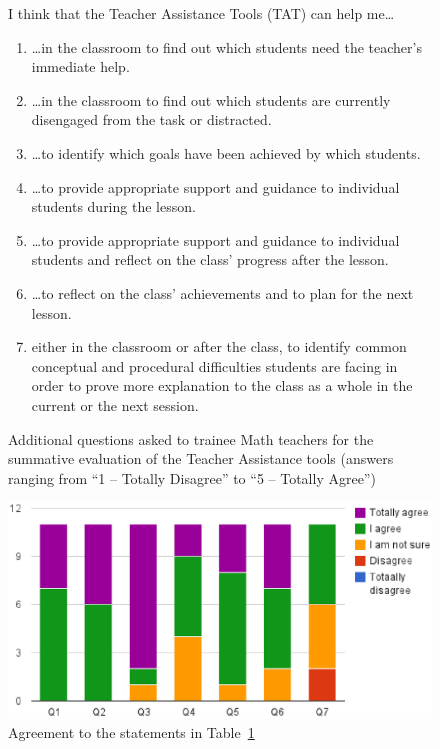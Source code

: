 \begin{figure}[htbp]
  \begin{framed}
  I think that the Teacher Assistance Tools (TAT) can help me\ldots
  \begin{enumerate}
  \item \ldots in the
    classroom to find out which students need the teacher's immediate
    help.
  \item \ldots in the classroom to find out which students are
    currently disengaged from the task or distracted.
  \item \ldots to identify which goals have been achieved by which
    students.
  \item \ldots to provide appropriate support and guidance to individual
    students during the lesson.
  \item \ldots to provide appropriate support and guidance to individual
    students and reflect on the class' progress after the lesson.
  \item \ldots to reflect on the class' achievements and to plan for
    the next lesson.
  \item either in the classroom or after the class, to identify common
    conceptual and procedural difficulties students are facing in
    order to prove more explanation to the class as a whole in the
    current or the next session.
  \end{enumerate}
  \end{framed}
  \vspace{-1em}
  \caption{Additional questions asked to trainee Math teachers for the
    summative evaluation of the Teacher Assistance tools (answers
    ranging from ``1 -- Totally Disagree'' to ``5 -- Totally Agree'')} 
  \label{fig:questions2-pgce}    
\end{figure}



\begin{figure}[htbp]
  \centering
    \includegraphics[width=\textwidth]{gfx/agreement.eps}
  \caption{Agreement to the statements in Table~\ref{fig:questions2-pgce}} 
\label{fig:additional}
\end{figure}

